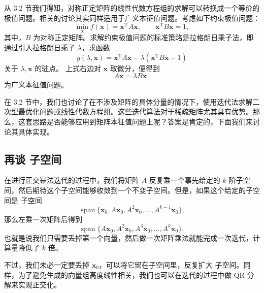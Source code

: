 从 3.2 节我们得知，对称正定矩阵的线性代数方程组的求解可以转换成一个等价的极值问题。相关的讨论其实同样适用于广义本征值问题。考虑如下约束极值问题：
\begin{equation}
\min_{\bm x} f(\bm x)=\bm x^{\mathrm T}A\bm x,
\qquad \bm x^{\mathrm T}B\bm x=1,
\tag{3.5.8}
\end{equation}
其中，$B$ 为对称正定矩阵。求解约束极值问题的标准策略是拉格朗日乘子法，即通过引入拉格朗日乘子 $\lambda$，求函数
\begin{equation}
g(\lambda,\bm x)=\bm x^{\mathrm T}A\bm x-\lambda(\bm x^{\mathrm T}B\bm x-1)
\tag{3.5.9}
\end{equation}
关于 $\lambda,\bm x$ 的驻点。
上式右边对 $\bm x$ 取微分，便得到
\begin{equation}
A\bm x=\lambda B\bm x,
\tag{3.5.10}
\end{equation}
为广义本征值问题。

在 3.2 节中，我们也讨论了在不涉及矩阵的具体分量的情况下，使用迭代法求解二次型最优化问题或线性代数方程组。这些迭代算法对于稀疏矩阵尤其具有优势。那么，这套思路是否能够应用到矩阵本征值问题上呢？答案是肯定的，下面我们来讨论其具体实现。

\subsection{再谈  子空间}

在进行正交幂法迭代的过程中，我们将矩阵 $A$ 反复乘一个事先给定的 $k$ 阶子空间，然后期待这个子空间能够收敛到一个不变子空间。但是，如果这个给定的子空间是  子空间
\[
\operatorname{span}\{\bm x_0,A\bm x_0,A^2\bm x_0,\ldots,A^{k-1}\bm x_0\},
\]
那么左乘一次矩阵后得到
\[
\operatorname{span}\{A\bm x_0,A^2\bm x_0,A^3\bm x_0,\ldots,A^k\bm x_0\},
\]
也就是说我们只需要丢掉第一个向量，然后做一次矩阵乘法就能完成一次迭代，计算量降低了 $k$ 倍。

不过，我们未必一定要丢掉 $\bm x_0$，可以将它留在子空间里，反复扩大  子空间。同样，为了避免生成的向量组高度线性相关，我们也可以在迭代的过程中做 QR 分解来实现正交化。

